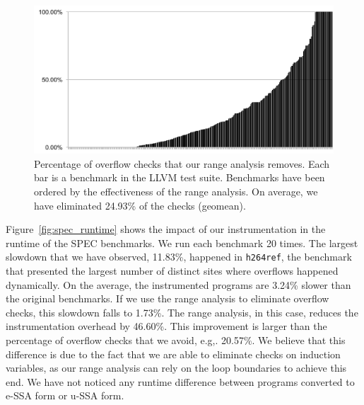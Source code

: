 \documentclass{sigplanconf}[10pt]
\begin{document}
\begin{figure}[t!]
\begin{center}
\includegraphics[width=\columnwidth]{images/percentage_elimination}
\end{center}
\caption{\label{fig:percentage_elimination}
Percentage of overflow checks that our range analysis removes.
Each bar is a benchmark in the LLVM test suite.
Benchmarks have been ordered by the effectiveness of the range analysis.
On average, we have eliminated 24.93\% of the checks (geomean).}
\end{figure}

Figure~\ref{fig:spec_runtime} shows the impact of our instrumentation in the
runtime of the SPEC benchmarks.
We run each benchmark 20 times.
The largest slowdown that we have observed, 11.83\%, happened in
\texttt{h264ref}, the benchmark that presented the largest number of distinct
sites where overflows happened dynamically. 
On the average, the instrumented programs are 3.24\% slower than the
original benchmarks.
If we use the range analysis to eliminate overflow checks, this slowdown falls
to 1.73\%.
The range analysis, in this case, reduces the instrumentation overhead by
46.60\%.
This improvement is larger than the percentage of overflow checks that we
avoid, e.g,. 20.57\%.
We believe that this difference is due to the fact that we are able to
eliminate checks on induction variables, as our range analysis can rely on
the loop boundaries to achieve this end.
We have not noticed any runtime difference between programs converted to
e-SSA form or u-SSA form.
\end{document}
